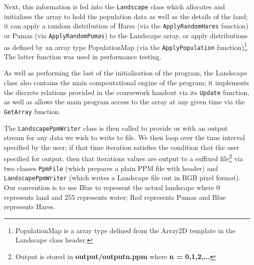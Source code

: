 Next, this information is fed into the \texttt{Landscape} class which allocates and initializes the array to hold the population data as well as the details of the land; it can apply a random distribution of Hares (via the \texttt{ApplyRandomHares} function) or Pumas (via \texttt{ApplyRandomPumas}) to the Landscape array, or apply distributions as defined by an array type PopulationMap (via the \texttt{ApplyPopulation} function)\footnote{PopulationMap is a array type defined from the Array2D template in the Landscape class header.}. The latter function was used in performance testing.

As well as performing the last of the initialisation of the program, the Landscape class also contains the main compoutational engine of the program; it implements the discrete relations provided in the coursework handout via its \texttt{Update} function, as well as allows the main program access to the array at any given time via the \texttt{GetArray} function.

The \texttt{LandscapePpmWriter} class is then called to provide us with an output stream for any data we wish to write to file. We then loop over the time interval specified by the user; if that time iteration satisfies the condition that the user specified for output, then that iterations values are output to a suffixed file\footnote{Output is stored in \textbf{output/outputn.ppm} where \textbf{n = 0,1,2,...}} via two classes \texttt{PpmFile} (which prepares a plain PPM file with header) and \texttt{LandscapePpmWriter} (which writes a Landscape file out in RGB pixel format). Our convention is to use Blue to represent the actual landscape where 0 represents land and 255 represents water; Red represents Pumas and Blue represents Hares.

